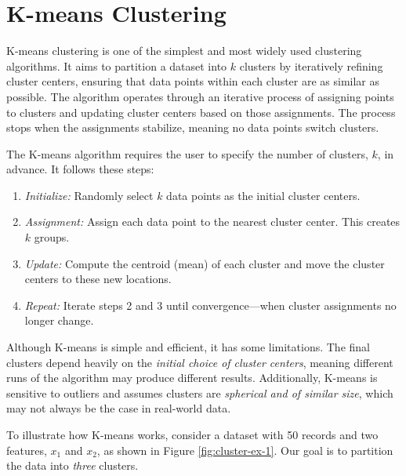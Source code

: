 \documentclass[
  11pt,
]{book}
\providecommand{\tightlist}{%
  \setlength{\itemsep}{0pt}\setlength{\parskip}{0pt}}
\theoremstyle{definition}
\theoremstyle{definition}
\theoremstyle{definition}
\theoremstyle{definition}
\theoremstyle{remark}
\begin{document}
\section{K-means Clustering}\label{kmeans}

K-means clustering is one of the simplest and most widely used clustering algorithms. It aims to partition a dataset into \emph{\(k\)} clusters by iteratively refining cluster centers, ensuring that data points within each cluster are as similar as possible. The algorithm operates through an iterative process of assigning points to clusters and updating cluster centers based on those assignments. The process stops when the assignments stabilize, meaning no data points switch clusters.

The K-means algorithm requires the user to specify the number of clusters, \emph{\(k\)}, in advance. It follows these steps:

\begin{enumerate}
\def\labelenumi{\arabic{enumi}.}
\tightlist
\item
  \emph{Initialize:} Randomly select \emph{\(k\)} data points as the initial cluster centers.\\
\item
  \emph{Assignment:} Assign each data point to the nearest cluster center. This creates \emph{\(k\)} groups.\\
\item
  \emph{Update:} Compute the centroid (mean) of each cluster and move the cluster centers to these new locations.\\
\item
  \emph{Repeat:} Iterate steps 2 and 3 until convergence---when cluster assignments no longer change.
\end{enumerate}

Although K-means is simple and efficient, it has some limitations. The final clusters depend heavily on the \emph{initial choice of cluster centers}, meaning different runs of the algorithm may produce different results. Additionally, K-means is sensitive to outliers and assumes clusters are \emph{spherical and of similar size}, which may not always be the case in real-world data.

To illustrate how K-means works, consider a dataset with 50 records and two features, \emph{\(x_1\)} and \emph{\(x_2\)}, as shown in Figure \ref{fig:cluster-ex-1}. Our goal is to partition the data into \emph{three} clusters.
\end{document}
